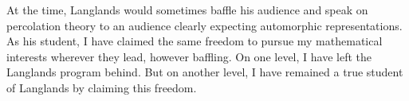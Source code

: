 At the time, Langlands would sometimes baffle his audience and
speak on percolation theory to an audience clearly expecting
automorphic representations.  As his student, I have claimed the same
freedom to pursue my mathematical interests wherever they lead,
however baffling. On one level, I have left the Langlands program
behind.  But on another level, I have remained a true student of
Langlands by claiming this freedom.








